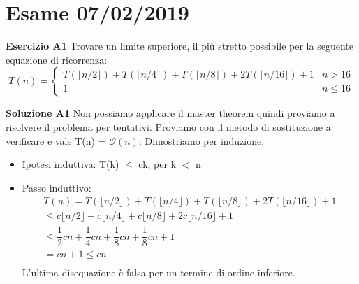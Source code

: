 \documentclass[../cheatSheetAlgoritmi.tex]{subfiles}
\begin{document}
\section{Esame 07/02/2019}
\textbf{Esercizio A1} Trovare un limite superiore, il più stretto possibile per la seguente equazione di ricorrenza: \
\begin{equation*}
  	T(n)=\begin{cases}
    	T(\lfloor n/2 \rfloor) + T(\lfloor n/4 \rfloor)+ T(\lfloor n/8 \rfloor)+ 2T(\lfloor n/16 \rfloor) + 1 & \text{$n > 16$}\\
    	1 & \text{$n \leq 16$}
  	\end{cases}
\end{equation*} 

\textbf{Soluzione A1} Non possiamo applicare il master theorem quindi proviamo a risolvere il problema per tentativi. Proviamo con il metodo di sostituzione a verificare e vale T(n) = $\mathcal{O}(n)$. Dimostriamo per induzione.

\begin{itemize}
	\item Ipotesi induttiva: T(k) $\leq$ ck, per k $<$ n
	\item Passo induttivo:
\begin{equation*}
\begin{aligned}	
T(n)= T(\lfloor n/2 \rfloor) + T(\lfloor n/4 \rfloor)+ T(\lfloor n/8 \rfloor)+ 2T(\lfloor n/16 \rfloor) + 1\\
\text{$\leq$} c\lfloor n/2 \rfloor + c\lfloor n/4 \rfloor+ c\lfloor n/8 \rfloor+ 2c\lfloor n/16 \rfloor + 1\\ 
\text{$\leq$}  \dfrac{1}{2}cn + \dfrac{1}{4}cn + \dfrac{1}{8}cn + \dfrac{1}{8}cn + 1\\
=  cn + 1 \text{$\leq$} cn \\
\end{aligned}
\end{equation*}
L'ultima disequazione è falsa per un termine di ordine inferiore. 
\end{itemize}
\end{document}
